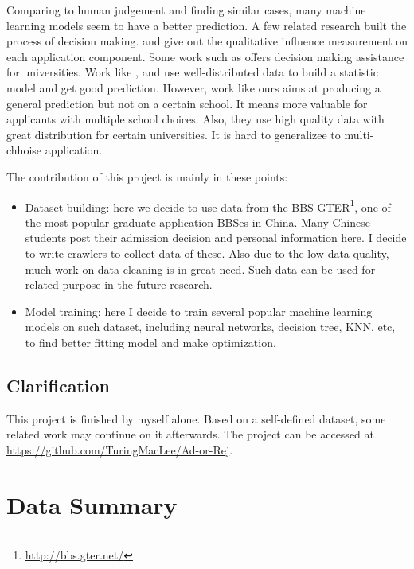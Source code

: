 \documentclass{article}
\begin{document}
Comparing to human judgement and finding similar cases, many machine learning models seem to have a better prediction. A few related research built the process of decision making. \cite{alzahranigot} and \cite{raghunathan2010demystifying} give out the qualitative influence measurement on each application component. Some work such as \cite{waters2014grade} offers decision making assistance for universities. Work like \cite{bruggink1996statistical}, \cite{gupta2016will} and \cite{moore1998expert} use well-distributed data to build a statistic model and get good prediction. However, work like ours aims at producing a general prediction but not on a certain school. It means more valuable for applicants with multiple school choices. Also, they use high quality data with great distribution for certain universities. It is hard to generalizee to multi-chhoise application.

The contribution of this project is mainly in these points:

\begin{itemize}
    \item Dataset building: here we decide to use data from the BBS GTER\footnote{\url{http://bbs.gter.net/}}, one of the most popular graduate application BBSes in China. Many Chinese students post their admission decision and personal information here. I decide to write crawlers to collect data of these. Also due to the low data quality, much work on data cleaning is in great need. Such data can be used for related purpose in the future research.\\
    \item Model training: here I decide to train several popular machine learning models on such dataset, including neural networks, decision tree, KNN, etc, to find better fitting model and make optimization.\\
\end{itemize}

\subsection*{Clarification}

This project is finished by myself alone. Based on a self-defined dataset, some related work may continue on it afterwards. The project can be accessed at \href{https://github.com/TuringMacLee/Ad-or-Rej}{https://github.com/TuringMacLee/Ad-or-Rej}.

\section{Data Summary}
\end{document}
